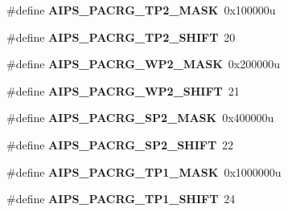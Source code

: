 \begin{DoxyCompactItemize}
\item 
\hypertarget{group___a_i_p_s___register___masks_ga13c9ec7cf11fb793b6db181633887de5}{}\#define {\bfseries A\+I\+P\+S\+\_\+\+P\+A\+C\+R\+G\+\_\+\+T\+P2\+\_\+\+M\+A\+S\+K}~0x100000u\label{group___a_i_p_s___register___masks_ga13c9ec7cf11fb793b6db181633887de5}

\item 
\hypertarget{group___a_i_p_s___register___masks_ga5c4d9abf6bcc1b640ac7b4776bd4084a}{}\#define {\bfseries A\+I\+P\+S\+\_\+\+P\+A\+C\+R\+G\+\_\+\+T\+P2\+\_\+\+S\+H\+I\+F\+T}~20\label{group___a_i_p_s___register___masks_ga5c4d9abf6bcc1b640ac7b4776bd4084a}

\item 
\hypertarget{group___a_i_p_s___register___masks_ga987a7de6bc9f4e3da4225d628ba97b49}{}\#define {\bfseries A\+I\+P\+S\+\_\+\+P\+A\+C\+R\+G\+\_\+\+W\+P2\+\_\+\+M\+A\+S\+K}~0x200000u\label{group___a_i_p_s___register___masks_ga987a7de6bc9f4e3da4225d628ba97b49}

\item 
\hypertarget{group___a_i_p_s___register___masks_ga41b3a2977ec0b20fd1216cfe73198a13}{}\#define {\bfseries A\+I\+P\+S\+\_\+\+P\+A\+C\+R\+G\+\_\+\+W\+P2\+\_\+\+S\+H\+I\+F\+T}~21\label{group___a_i_p_s___register___masks_ga41b3a2977ec0b20fd1216cfe73198a13}

\item 
\hypertarget{group___a_i_p_s___register___masks_ga3a1ef38d40b35bb74bbbdcf2dc307d2f}{}\#define {\bfseries A\+I\+P\+S\+\_\+\+P\+A\+C\+R\+G\+\_\+\+S\+P2\+\_\+\+M\+A\+S\+K}~0x400000u\label{group___a_i_p_s___register___masks_ga3a1ef38d40b35bb74bbbdcf2dc307d2f}

\item 
\hypertarget{group___a_i_p_s___register___masks_gac96633d0a08176c1e41ade0991ffc926}{}\#define {\bfseries A\+I\+P\+S\+\_\+\+P\+A\+C\+R\+G\+\_\+\+S\+P2\+\_\+\+S\+H\+I\+F\+T}~22\label{group___a_i_p_s___register___masks_gac96633d0a08176c1e41ade0991ffc926}

\item 
\hypertarget{group___a_i_p_s___register___masks_ga3439f0738de26e4c7ccb572799cba0d6}{}\#define {\bfseries A\+I\+P\+S\+\_\+\+P\+A\+C\+R\+G\+\_\+\+T\+P1\+\_\+\+M\+A\+S\+K}~0x1000000u\label{group___a_i_p_s___register___masks_ga3439f0738de26e4c7ccb572799cba0d6}

\item 
\hypertarget{group___a_i_p_s___register___masks_gac37dd16ba6fb13c582a25c30075b9db7}{}\#define {\bfseries A\+I\+P\+S\+\_\+\+P\+A\+C\+R\+G\+\_\+\+T\+P1\+\_\+\+S\+H\+I\+F\+T}~24\label{group___a_i_p_s___register___masks_gac37dd16ba6fb13c582a25c30075b9db7}


\end{DoxyCompactItemize}
